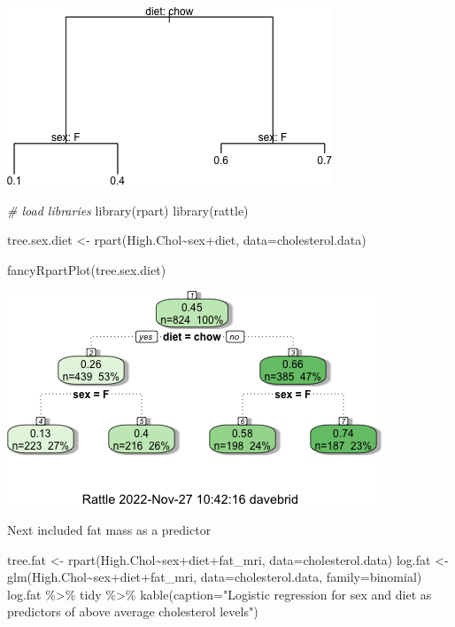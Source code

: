 \documentclass[
]{article}
\newenvironment{Shaded}{\begin{snugshade}}{\end{snugshade}}
\newcommand{\AttributeTok}[1]{\textcolor[rgb]{0.77,0.63,0.00}{#1}}
\newcommand{\CommentTok}[1]{\textcolor[rgb]{0.56,0.35,0.01}{\textit{#1}}}
\newcommand{\FunctionTok}[1]{\textcolor[rgb]{0.00,0.00,0.00}{#1}}
\newcommand{\NormalTok}[1]{#1}
\newcommand{\OtherTok}[1]{\textcolor[rgb]{0.56,0.35,0.01}{#1}}
\newcommand{\SpecialCharTok}[1]{\textcolor[rgb]{0.00,0.00,0.00}{#1}}
\newcommand{\StringTok}[1]{\textcolor[rgb]{0.31,0.60,0.02}{#1}}
\begin{document}
\includegraphics{figures/sex-diet-tree-1.png}

\begin{Shaded}
\begin{Highlighting}[]
\CommentTok{\# load libraries}
\FunctionTok{library}\NormalTok{(rpart)}
\FunctionTok{library}\NormalTok{(rattle)}

\NormalTok{tree.sex.diet }\OtherTok{\textless{}{-}} \FunctionTok{rpart}\NormalTok{(High.Chol}\SpecialCharTok{\textasciitilde{}}\NormalTok{sex}\SpecialCharTok{+}\NormalTok{diet, }\AttributeTok{data=}\NormalTok{cholesterol.data)}

\FunctionTok{fancyRpartPlot}\NormalTok{(tree.sex.diet)}
\end{Highlighting}
\end{Shaded}

\includegraphics{figures/sex-diet-tree-2.png}

Next included fat mass as a predictor

\begin{Shaded}
\begin{Highlighting}[]
\NormalTok{tree.fat }\OtherTok{\textless{}{-}} \FunctionTok{rpart}\NormalTok{(High.Chol}\SpecialCharTok{\textasciitilde{}}\NormalTok{sex}\SpecialCharTok{+}\NormalTok{diet}\SpecialCharTok{+}\NormalTok{fat\_mri, }\AttributeTok{data=}\NormalTok{cholesterol.data)}
\NormalTok{log.fat }\OtherTok{\textless{}{-}} \FunctionTok{glm}\NormalTok{(High.Chol}\SpecialCharTok{\textasciitilde{}}\NormalTok{sex}\SpecialCharTok{+}\NormalTok{diet}\SpecialCharTok{+}\NormalTok{fat\_mri, }\AttributeTok{data=}\NormalTok{cholesterol.data, }\AttributeTok{family=}\StringTok{\textquotesingle{}binomial\textquotesingle{}}\NormalTok{)}
\NormalTok{log.fat }\SpecialCharTok{\%\textgreater{}\%}\NormalTok{ tidy }\SpecialCharTok{\%\textgreater{}\%} \FunctionTok{kable}\NormalTok{(}\AttributeTok{caption=}\StringTok{"Logistic regression for sex and diet as predictors of above average cholesterol levels"}\NormalTok{)}
\end{Highlighting}
\end{Shaded}
\end{document}
